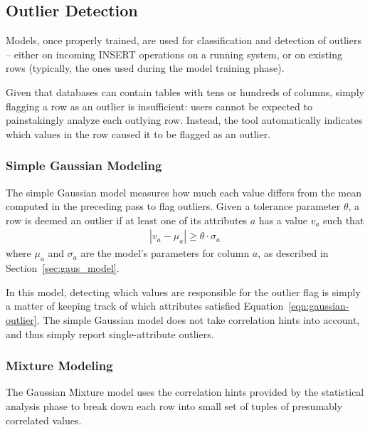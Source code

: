 \subsection{Outlier Detection}
\label{sec:outlier-detection}

Models, once properly trained, are used for classification and detection of outliers -- either on incoming INSERT operations on a running system, or on existing rows (typically, the ones used during the model training phase). %

Given that databases can contain tables with tens or hundreds of columns, simply flagging a row as an outlier is insufficient: users cannot be expected to painstakingly analyze each outlying row. Instead, the tool automatically indicates which values in the row caused it to be flagged as an outlier.

\subsubsection{Simple Gaussian Modeling}
The simple Gaussian model measures how much each value differs from the mean computed in the preceding pass to flag outliers. Given a tolerance parameter $\theta$, a row is deemed an outlier if at least one of its attributes $a$ has a value $v_a$ such that
\begin{align}
  |v_a - \mu_a| \ge \theta \cdot \sigma_a
  \label{eqn:gaussian-outlier}
\end{align}
where $\mu_a$ and $\sigma_a$ are the model's parameters for column $a$, as described in Section~\ref{sec:gaus_model}.

In this model, detecting which values are responsible for the outlier flag is simply a matter of keeping track of which attributes satisfied Equation~\eqref{eqn:gaussian-outlier}. The simple Gaussian model does not take correlation hints into account, and thus simply report single-attribute outliers.

\subsubsection{Mixture Modeling}
The Gaussian Mixture model uses the correlation hints provided by the statistical analysis phase to break down each row into small set of tuples of presumably correlated values.

